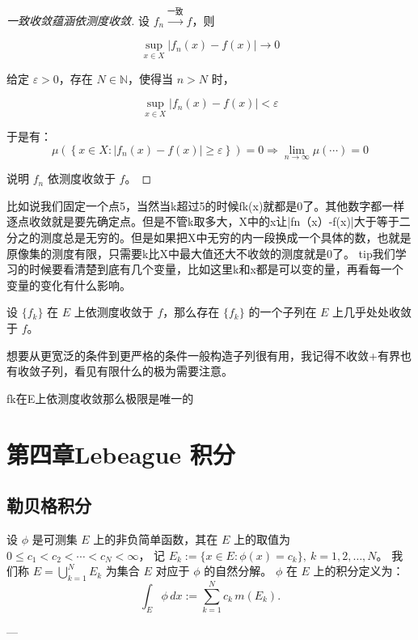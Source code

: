 \documentclass[lang=cn,10pt]{elegantbook}
\begin{document}
\begin{proof}[一致收敛蕴涵依测度收敛]
设 $f_n \overset{\text{一致}}{\longrightarrow} f$，则

\[
\sup_{x \in X} |f_n(x) - f(x)| \to 0
\]

给定 $\varepsilon > 0$，存在 $N \in \mathbb{N}$，使得当 $n > N$ 时，

\[
\sup_{x \in X} |f_n(x) - f(x)| < \varepsilon
\]

于是有：
\[
\mu\left(\left\{x \in X : |f_n(x) - f(x)| \ge \varepsilon \right\} \right) = 0
\Rightarrow \lim_{n \to \infty} \mu(\cdots) = 0
\]

说明 $f_n$ 依测度收敛于 $f$。
\end{proof}
比如说我们固定一个点5，当然当k超过5的时候fk(x)就都是0了。其他数字都一样逐点收敛就是要先确定点。但是不管k取多大，X中的x让|fn（x）-f(x)|大于等于二分之的测度总是无穷的。但是如果把X中无穷的内一段换成一个具体的数，也就是原像集的测度有限，只需要k比X中最大值还大不收敛的测度就是0了。
tip我们学习的时候要看清楚到底有几个变量，比如这里k和x都是可以变的量，再看每一个变量的变化有什么影响。
\begin{theorem}[Riesz 定理]
设 $\{f_k\}$ 在 $E$ 上依测度收敛于 $f$，那么存在 $\{f_k\}$ 的一个子列在 $E$ 上几乎处处收敛于 $f$。
\end{theorem}
想要从更宽泛的条件到更严格的条件一般构造子列很有用，我记得不收敛+有界也有收敛子列，看见有限什么的极为需要注意。
\begin{corollary}[依测度收敛的极限的唯一性]
    {fk}在E上依测度收敛那么极限是唯一的
\end{corollary}
\chapter{第四章Lebeague 积分}
\section{勒贝格积分}
\begin{definition}[简单函数积分的定义]
设 $\phi$ 是可测集 $E$ 上的非负简单函数，其在 $E$ 上的取值为 $0 \leq c_1 < c_2 < \cdots < c_N < \infty$，  
记 $E_k := \{x \in E : \phi(x) = c_k\},\ k = 1, 2, \dots, N$。  
我们称 $E = \bigcup_{k=1}^{N} E_k$ 为集合 $E$ 对应于 $\phi$ 的自然分解。  
$\phi$ 在 $E$ 上的积分定义为：
\[
\int_E \phi\, dx := \sum_{k=1}^N c_k\, m(E_k).
\]
\end{definition}

---
\end{document}
